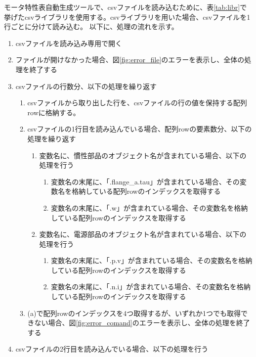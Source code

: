 モータ特性表自動生成ツールで、csvファイルを読み込むために、表\ref{tab:libr}で挙げたcsvライブラリを使用する。csvライブラリを用いた場合、csvファイルを1行ごとに分けて読み込む。
以下に、処理の流れを示す。
\begin{enumerate}
    \item csvファイルを読み込み専用で開く
    \item ファイルが開けなかった場合、図\ref{fig:error_file}のエラーを表示し、全体の処理を終了する
    \item csvファイルの行数分、以下の処理を繰り返す
    \begin{enumerate}
        \item csvファイルから取り出した行を、csvファイルの行の値を保持する配列rowに格納する。
        \item csvファイルの1行目を読み込んでいる場合、配列rowの要素数分、以下の処理を繰り返す
            \begin{enumerate}
                \item 変数名に、慣性部品のオブジェクト名が含まれている場合、以下の処理を行う
                \begin{enumerate}
                    \item 変数名の末尾に、「.flange\_a.tau」が含まれている場合、その変数名を格納している配列rowのインデックスを取得する
                    \item 変数名の末尾に、「.w」が含まれている場合、その変数名を格納している配列rowのインデックスを取得する
                \end{enumerate}
                \item 変数名に、電源部品のオブジェクト名が含まれている場合、以下の処理を行う
                \begin{enumerate}
                    \item 変数名の末尾に、「.p.v」が含まれている場合、その変数名を格納している配列rowのインデックスを取得する
                    \item 変数名の末尾に、「.n.i」が含まれている場合、その変数名を格納している配列rowのインデックスを取得する
                \end{enumerate}
            \end{enumerate}
            \item (a)で配列rowのインデックスを4つ取得するが、いずれか1つでも取得できない場合、図\ref{fig:error_comand}のエラーを表示し、全体の処理を終了する
    \end{enumerate}
        \item csvファイルの2行目を読み込んでいる場合、以下の処理を行う

\end{enumerate}
